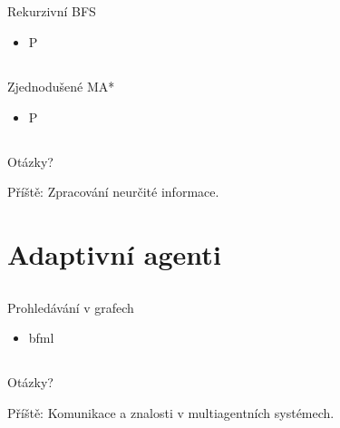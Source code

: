 \documentclass{beamer}
\begin{document}
\subsection{}
\begin{frame}{Rekurzivní BFS}
\begin{itemize}
\item P
\end{itemize}
\end{frame}

\subsection{}
\begin{frame}{Zjednodušené MA*}
\begin{itemize}
\item P
\end{itemize}
\end{frame}

\subsection{}
\begin{frame}{Otázky?}
\begin{center}
Příště: Zpracování neurčité informace.
\end{center}
\end{frame}

\section{Adaptivní agenti}

\subsection{}
\begin{frame}{Prohledávání v grafech}
\begin{itemize}
\item bfml
\end{itemize}
\end{frame}

\subsection{}
\begin{frame}{Otázky?}
\begin{center}
Příště: Komunikace a znalosti v multiagentních systémech.
\end{center}
\end{frame}
\end{document}
